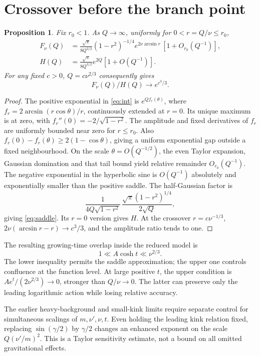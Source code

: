\documentclass[11pt,a4paper]{article}
\newtheorem{proposition}{Proposition}
\begin{document}
\section{Crossover before the branch point}
\begin{proposition}
Fix \(r_0<1\). As \(Q\to\infty\), uniformly for \(0<r=Q/\nu\le r_0\),
\begin{align}
 F_\nu(Q)&=\frac{\sqrt\pi}{8Q^{3/2}}(1-r^2)^{-1/4}
 e^{2\nu\arcsin r}\,[1+O_{r_0}(Q^{-1})],\label{eq:saddle}\\
 H(Q)&=\frac{\sqrt\pi}{8Q^{3/2}}e^{2Q}[1+O(Q^{-1})].
\end{align}
For any fixed \(c>0\), \(Q=c\nu^{2/3}\) consequently gives
\begin{equation}
 F_\nu(Q)/H(Q)\longrightarrow e^{c^3/3}. \label{eq:cross}
\end{equation}
\end{proposition}
\begin{proof}
The positive exponential in \eqref{eq:int} is \(e^{Q f_r(\theta)}\),
where \(f_r=2\arcsin(r\cos\theta)/r\), continuously extended at \(r=0\).
Its unique maximum is at zero, with \(f_r''(0)=-2/\sqrt{1-r^2}\).
The amplitude and fixed derivatives of \(f_r\) are uniformly bounded
near zero for \(r\le r_0\). Also
\(f_r(0)-f_r(\theta)\ge2(1-\cos\theta)\), giving a uniform exponential
gap outside a fixed neighbourhood. On the scale \(\theta=O(Q^{-1/2})\),
the even Taylor expansion, Gaussian domination and that tail bound yield
relative remainder \(O_{r_0}(Q^{-1})\). The negative exponential in
the hyperbolic sine is \(O(Q^{-1})\) absolutely and exponentially smaller
than the positive saddle. The half-Gaussian factor is
\[
 \frac{1}{4Q\sqrt{1-r^2}}\,
 \frac{\sqrt\pi(1-r^2)^{1/4}}{2\sqrt Q},
\]
giving \eqref{eq:saddle}. Its \(r=0\) version gives \(H\).
At the crossover \(r=c\nu^{-1/3}\),
\(2\nu(\arcsin r-r)\to c^3/3\), and the amplitude ratio tends to one.
\end{proof}
The resulting growing-time overlap inside the reduced model is
\begin{equation}
 1\ll A\cosh t\ll\nu^{2/3}.
\end{equation}
The lower inequality permits the saddle approximation; the upper one
controls confluence at the function level. At large positive \(t\),
the upper condition is \(Ae^t/(2\nu^{2/3})\to0\), stronger than
\(Q/\nu\to0\). The latter can preserve only the leading logarithmic
action while losing relative accuracy.

The earlier heavy-background and small-kink limits require separate
control for simultaneous scalings of \(m,\nu',\nu,t\).
Even holding the leading kink relation fixed, replacing
\(\sin(\gamma/2)\) by \(\gamma/2\) changes an enhanced exponent on the
scale \(Q(\nu'/m)^2\). This is a Taylor sensitivity estimate, not a
bound on all omitted gravitational effects.
\end{document}
